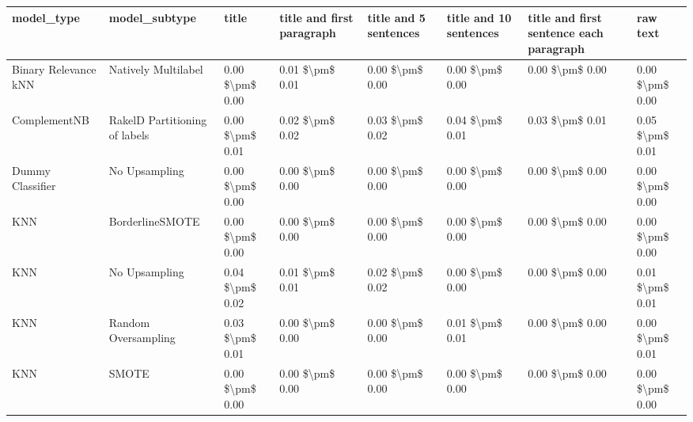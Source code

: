 \begin{tabular}{llllllll}
\toprule
                     model\_type &                 model\_subtype &           title & title and first paragraph & title and 5 sentences & title and 10 sentences & title and first sentence each paragraph &        raw text \\
\midrule
           Binary Relevance kNN &           Natively Multilabel & 0.00 \$\textbackslash pm\$ 0.00 &           0.01 \$\textbackslash pm\$ 0.01 &       0.00 \$\textbackslash pm\$ 0.00 &        0.00 \$\textbackslash pm\$ 0.00 &                         0.00 \$\textbackslash pm\$ 0.00 & 0.00 \$\textbackslash pm\$ 0.00 \\
                   ComplementNB & RakelD Partitioning of labels & 0.00 \$\textbackslash pm\$ 0.01 &           0.02 \$\textbackslash pm\$ 0.02 &       0.03 \$\textbackslash pm\$ 0.02 &        0.04 \$\textbackslash pm\$ 0.01 &                         0.03 \$\textbackslash pm\$ 0.01 & 0.05 \$\textbackslash pm\$ 0.01 \\
               Dummy Classifier &                 No Upsampling & 0.00 \$\textbackslash pm\$ 0.00 &           0.00 \$\textbackslash pm\$ 0.00 &       0.00 \$\textbackslash pm\$ 0.00 &        0.00 \$\textbackslash pm\$ 0.00 &                         0.00 \$\textbackslash pm\$ 0.00 & 0.00 \$\textbackslash pm\$ 0.00 \\
                            KNN &               BorderlineSMOTE & 0.00 \$\textbackslash pm\$ 0.00 &           0.00 \$\textbackslash pm\$ 0.00 &       0.00 \$\textbackslash pm\$ 0.00 &        0.00 \$\textbackslash pm\$ 0.00 &                         0.00 \$\textbackslash pm\$ 0.00 & 0.00 \$\textbackslash pm\$ 0.00 \\
                            KNN &                 No Upsampling & 0.04 \$\textbackslash pm\$ 0.02 &           0.01 \$\textbackslash pm\$ 0.01 &       0.02 \$\textbackslash pm\$ 0.02 &        0.00 \$\textbackslash pm\$ 0.00 &                         0.00 \$\textbackslash pm\$ 0.00 & 0.01 \$\textbackslash pm\$ 0.01 \\
                            KNN &           Random Oversampling & 0.03 \$\textbackslash pm\$ 0.01 &           0.00 \$\textbackslash pm\$ 0.00 &       0.00 \$\textbackslash pm\$ 0.00 &        0.01 \$\textbackslash pm\$ 0.01 &                         0.00 \$\textbackslash pm\$ 0.00 & 0.00 \$\textbackslash pm\$ 0.01 \\
                            KNN &                         SMOTE & 0.00 \$\textbackslash pm\$ 0.00 &           0.00 \$\textbackslash pm\$ 0.00 &       0.00 \$\textbackslash pm\$ 0.00 &        0.00 \$\textbackslash pm\$ 0.00 &                         0.00 \$\textbackslash pm\$ 0.00 & 0.00 \$\textbackslash pm\$ 0.00 \\

\end{tabular}
